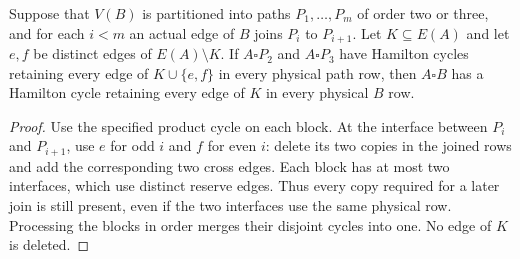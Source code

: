 \begin{lemma}
Suppose that $V(B)$ is partitioned into paths $P_1,\ldots,P_m$ of order two
or three, and for each $i<m$ an actual edge of $B$ joins $P_i$ to $P_{i+1}$.
Let $K\subseteq E(A)$ and let $e,f$ be distinct edges of $E(A)\setminus K$.
If $A\square P_2$ and $A\square P_3$ have Hamilton cycles retaining every
edge of $K\cup\{e,f\}$ in every physical path row, then $A\square B$ has
a Hamilton cycle retaining every edge of $K$ in every physical $B$ row.
\end{lemma}
\begin{proof}
Use the specified product cycle on each block. At the interface between
$P_i$ and $P_{i+1}$, use $e$ for odd $i$ and $f$ for even $i$:
delete its two copies in the joined rows and add the corresponding two
cross edges. Each block has at most two interfaces, which use distinct
reserve edges. Thus every copy required for a later join is still present,
even if the two interfaces use the same physical row. Processing the
blocks in order merges their disjoint cycles into one. No edge of $K$
is deleted.
\end{proof}

%
